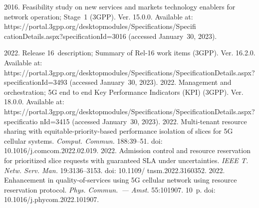   \begin{multicols}{2}

\renewcommand{\bibname}{\protect\rmfamily References}

{\small\frenchspacing
 {%
 \begin{thebibliography}{99} 

2016. Feasibility study on new services and markets technology enablers for network operation; Stage~1 (3GPP). Ver. 15.0.0. Available at: 
{\sf https://\linebreak portal.3gpp.org/desktopmodules/Specifications/Specifi cationDetails.aspx?specificationId=3016} (accessed January~30, 2023).

2022. Release 16~description; Summary of Rel-16 work items (3GPP).  Ver. 16.2.0. Available at: 
{\sf https://portal.3gpp.org/desktop\linebreak  modules/Specifications/SpecificationDetails.aspx?speci\linebreak ficationId=3493} (accessed January~30, 2023).
2022. Management and orchestration; 5G end to end Key Performance Indicators (KPI) (3GPP). Ver. 18.0.0. Available at:
{\sf  https://\linebreak portal.3gpp.org/desktopmodules/Specifications/Specifi\linebreak cationDetails.aspx?specificatio nId=3415} (accessed January~30, 2023).
 2022. Multi-tenant resource sharing with equitable-priority-based performance isolation of slices for 5G cellular systems. 
 \textit{Comput. Commun.} 188:39--51. doi: 10.1016/j.comcom.2022.02.019.
2022. Admission control and resource reservation for prioritized slice requests with guaranteed SLA under uncertainties. 
\textit{IEEE T. Netw. Serv. Man.} 19:3136--3153. doi: 10.1109/ tnsm.2022.3160352.
 2022. Enhancement in quality-of-services using 5G cellular network using resource reservation protocol. \textit{Phys. Commun.~--- Amst.}
  55:101907. 10~p. doi: 10.1016/j.phycom.2022.101907. 


\end{thebibliography}}}
\end{multicols}
